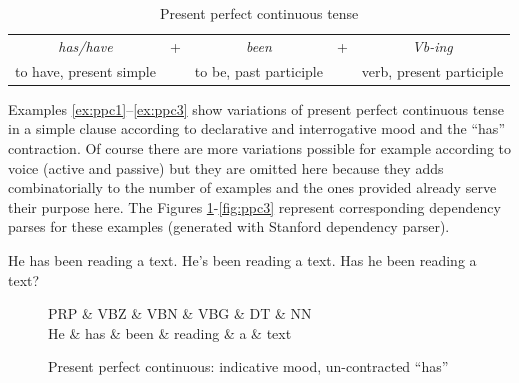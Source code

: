 \begin{table}[!ht]
	\centering
	\begin{tabular}{|clclc|}
		\hline
		\textit{has/have}       & + & \textit{been}          & + & \textit{Vb-ing}          \\
		to have, present simple &   & to be, past participle &   & verb, present participle \\ \hline
	\end{tabular}
	\caption{Present perfect continuous tense}
	\label{tab:ppc-pattern}
\end{table}

Examples \ref{ex:ppc1}--\ref{ex:ppc3} show variations of present perfect continuous tense in a simple clause according to declarative and interrogative mood and the ``has'' contraction. Of course there are more variations possible for example according to voice (active and passive) but they are omitted here because they adds combinatorially to the number of examples and the ones provided already serve their purpose here. The Figures \ref{fig:ppc1}-\ref{fig:ppc3} represent corresponding dependency parses for these examples (generated with Stanford dependency parser).

\begin{exe}
	\ex\label{ex:ppc1} He has been reading a text.
	\ex\label{ex:ppc2} He's been reading a text.
	\ex\label{ex:ppc3} Has he been reading a text?
\end{exe}

	\begin{figure}[!ht]
		\centering
		\begin{dependency}
			\begin{deptext}[]
				PRP \& VBZ \& VBN \& VBG \& DT \& NN \\
				He \& has \& been \& reading \& a \& text \\
			\end{deptext}
		\end{dependency}
		\caption{Present perfect continuous: indicative mood, un-contracted ``has''}
		\label{fig:ppc1}
	\end{figure}

